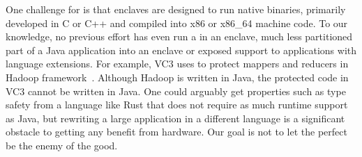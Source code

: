 One challenge for \java{}
is that 
\sgx{} enclaves are designed to run native binaries, primarily developed in C or C++ and compiled into x86 or x86\_64 machine code.
To our knowledge, no previous effort has even run a \jvm{} in an enclave, much less partitioned part of a Java application into an enclave
or exposed \sgx{} support to \java{} applications with language extensions.
For example, VC3 uses \sgx{} to protect mappers and reducers in Hadoop framework~\cite{vc3}.
Although Hadoop is written in Java, the protected code in VC3 cannot be written in Java.
One could arguably get properties such as type safety from a language like Rust that does not require as much runtime support as Java,
but rewriting a large application in a different language is a significant obstacle to getting any benefit from \sgx{} hardware.
Our goal is not to let the perfect be the enemy of the good.






